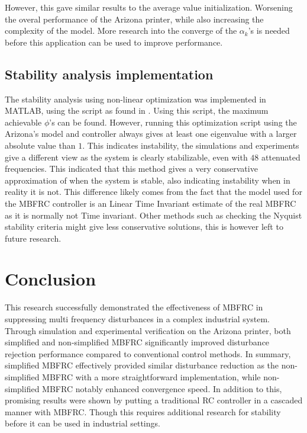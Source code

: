 \documentclass[journal]{IEEEtran}
\begin{document}
However, this gave similar results to the average value initialization. Worsening the overal performance of the Arizona printer, while also increasing the complexity of the model. More research into the converge of the $\alpha_k$'s is needed before this application can be used to improve performance.

\subsection{Stability analysis implementation}
The stability analysis using non-linear optimization was implemented in MATLAB, using the script as found in \cite{github_2025_Learning_Control_2025}. Using this script, the maximum achievable $\phi$'s can be found. However, running this optimization script using the Arizona's model and controller always gives at least one eigenvalue with a larger absolute value than $1$. This indicates instability, the simulations and experiments give a different view as the system is clearly stabilizable, even with $48$ attenuated frequencies. This indicated that this method gives a very conservative approximation of when the system is stable, also indicating instability when in reality it is not. This difference likely comes from the fact that the model used for the MBFRC controller is an Linear Time Invariant estimate of the real MBFRC as it is normally not Time invariant. Other methods such as checking the Nyquist stability criteria might give less conservative solutions, this is however left to future research.

\section{Conclusion} \label{sec:Conclusion}
This research successfully demonstrated the effectiveness of MBFRC in suppressing multi frequency disturbances in a complex industrial system. Through simulation and experimental verification on the Arizona printer, both simplified and non-simplified MBFRC significantly improved disturbance rejection performance compared to conventional control methods. In summary, simplified MBFRC effectively provided similar disturbance reduction as the non-simplified MBFRC with a more straightforward implementation, while non-simplified MBFRC notably enhanced convergence speed. In addition to this, promising results were shown by putting a traditional RC controller in a cascaded manner with MBFRC. Though this requires additional research for stability before it can be used in industrial settings.
\end{document}
